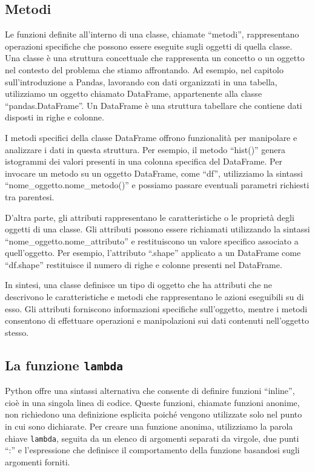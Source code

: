 \documentclass[
  letterpaper,
  krantz2]{{[}./krantz{]}}
\begin{document}
\subsection{Metodi}\label{metodi-1}

Le funzioni definite all'interno di una classe, chiamate ``metodi'',
rappresentano operazioni specifiche che possono essere eseguite sugli
oggetti di quella classe. Una classe è una struttura concettuale che
rappresenta un concetto o un oggetto nel contesto del problema che
stiamo affrontando. Ad esempio, nel capitolo sull'introduzione a Pandas,
lavorando con dati organizzati in una tabella, utilizziamo un oggetto
chiamato DataFrame, appartenente alla classe ``pandas.DataFrame''. Un
DataFrame è una struttura tabellare che contiene dati disposti in righe
e colonne.

I metodi specifici della classe DataFrame offrono funzionalità per
manipolare e analizzare i dati in questa struttura. Per esempio, il
metodo ``hist()'' genera istogrammi dei valori presenti in una colonna
specifica del DataFrame. Per invocare un metodo su un oggetto DataFrame,
come ``df'', utilizziamo la sintassi ``nome\_oggetto.nome\_metodo()'' e
possiamo passare eventuali parametri richiesti tra parentesi.

D'altra parte, gli attributi rappresentano le caratteristiche o le
proprietà degli oggetti di una classe. Gli attributi possono essere
richiamati utilizzando la sintassi ``nome\_oggetto.nome\_attributo'' e
restituiscono un valore specifico associato a quell'oggetto. Per
esempio, l'attributo ``.shape'' applicato a un DataFrame come
``df.shape'' restituisce il numero di righe e colonne presenti nel
DataFrame.

In sintesi, una classe definisce un tipo di oggetto che ha attributi che
ne descrivono le caratteristiche e metodi che rappresentano le azioni
eseguibili su di esso. Gli attributi forniscono informazioni specifiche
sull'oggetto, mentre i metodi consentono di effettuare operazioni e
manipolazioni sui dati contenuti nell'oggetto stesso.

\subsection{\texorpdfstring{La funzione
\texttt{lambda}}{La funzione lambda}}\label{la-funzione-lambda}

Python offre una sintassi alternativa che consente di definire funzioni
``inline'', cioè in una singola linea di codice. Queste funzioni,
chiamate funzioni anonime, non richiedono una definizione esplicita
poiché vengono utilizzate solo nel punto in cui sono dichiarate. Per
creare una funzione anonima, utilizziamo la parola chiave
\texttt{lambda}, seguita da un elenco di argomenti separati da virgole,
due punti ``:'' e l'espressione che definisce il comportamento della
funzione basandosi sugli argomenti forniti.
\end{document}
